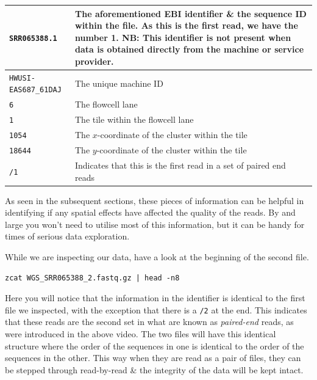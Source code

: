 \begin{tabular}{|p{5cm} | p{9cm} |}
  \hline
  \texttt{SRR065388.1} & The aforementioned EBI identifier \& the sequence ID within the file. As this is the first read, we have the number 1. NB: This identifier is \textbf{not} present when data is obtained directly from the machine or service provider.\\
  \hline
  \texttt{HWUSI-EAS687\_61DAJ} & The unique machine ID \\
  \hline
  \texttt{6} & The flowcell lane \\
  \hline
  \texttt{1} & The tile within the flowcell lane \\
  \hline
  \texttt{1054} & The $x$-coordinate of the cluster within the tile \\
  \hline
  \texttt{18644} & The $y$-coordinate of the cluster within the tile \\
  \hline
  \texttt{/1} & Indicates that this is the first read in a set of paired end reads \\
  \hline
\end{tabular}

As seen in the subsequent sections, these pieces of information can be helpful in identifying if any spatial effects have affected the quality of the reads.
By and large you won't need to utilise most of this information, but it can be handy for times of serious data exploration.\\

\begin{steps}
While we are inspecting our data, have a look at the beginning of the second file.
\begin{lstlisting}
zcat WGS_SRR065388_2.fastq.gz | head -n8
\end{lstlisting}
Here you will notice that the information in the identifier is identical to the first file we inspected, with the exception that there is a \texttt{/2} at the end.
This indicates that these reads are the second set in what are known as \textit{paired-end} reads, as were introduced in the above video.
The two files will have this identical structure where the order of the sequences in one is identical to the order of the sequences in the other.
This way when they are read as a pair of files, they can be stepped through read-by-read \& the integrity of the data will be kept intact.
\end{steps}

